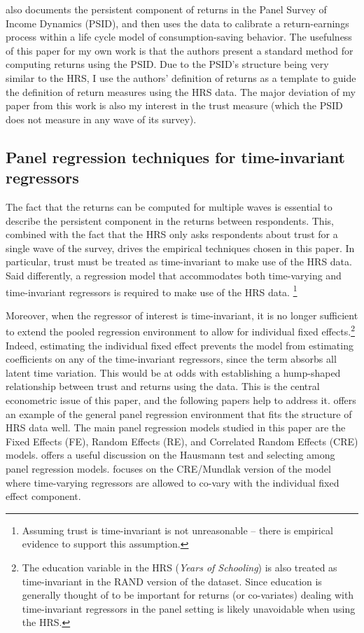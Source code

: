 \par \cite{Daminato2024} also documents the persistent component of returns in the Panel Survey of Income Dynamics (PSID), and then uses the data to calibrate a return-earnings process within a life cycle model of consumption-saving behavior. The usefulness of this paper for my own work is that the authors present a standard method for computing returns using the PSID. Due to the PSID's structure being very similar to the HRS, I use the authors' definition of returns as a template to guide the definition of return measures using the HRS data. The major deviation of my paper from this work is also my interest in the trust measure (which the PSID does not measure in any wave of its survey).

\subsection{Panel regression techniques for time-invariant regressors}

\par The fact that the returns can be computed for multiple waves is essential to describe the persistent component in the returns between respondents. This, combined with the fact that the HRS only asks respondents about trust for a single wave of the survey, drives the empirical techniques chosen in this paper. In particular, trust must be treated as time-invariant to make use of the HRS data. Said differently, a regression model that accommodates both time-varying and time-invariant regressors is required to make use of the HRS data. \footnote{Assuming trust is time-invariant is not unreasonable -- there is empirical evidence to support this assumption.} 

\par Moreover, when the regressor of interest is time-invariant, it is no longer sufficient to extend the pooled regression environment to allow for individual fixed effects.\footnote{The education variable in the HRS (\textit{Years of Schooling}) is also treated as time-invariant in the RAND version of the dataset. Since education is generally thought of to be important for returns (or co-variates) dealing with time-invariant regressors in the panel setting is likely unavoidable when using the HRS.} Indeed, estimating the individual fixed effect prevents the model from estimating coefficients on any of the time-invariant regressors, since the term absorbs all latent time variation. This would be at odds with establishing a hump-shaped relationship between trust and returns using the data. This is the central econometric issue of this paper, and the following papers help to address it. \cite{BaltagiLiu2026Mundlak} offers an example of the general panel regression environment that fits the structure of HRS data well. The main panel regression models studied in this paper are the Fixed Effects (FE), Random Effects (RE), and Correlated Random Effects (CRE) models. \cite{Wooldridge2019CRE} offers a useful discussion on the Hausmann test and selecting among panel regression models. \cite{BollenBrand2010} focuses on the CRE/Mundlak version of the model where time-varying regressors are allowed to co-vary with the individual fixed effect component. 
